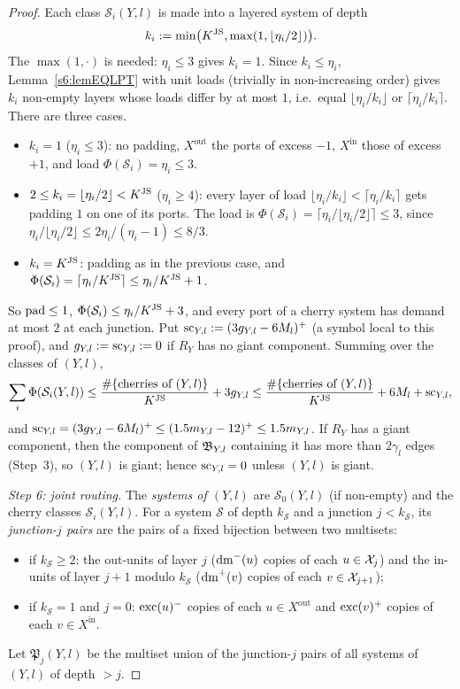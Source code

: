 \begin{proof}
Each class $\mathcal S_i(Y,l)$ is made into a layered system of depth
\[
k_i:=\min\bigl(K^{\mathrm{JS}},\max(1,\lfloor\eta_i/2\rfloor)\bigr).
\]
The $\max(1,\cdot)$ is needed: $\eta_i\le3$ gives $k_i=1$. Since $k_i\le\eta_i$, Lemma~\ref{s6:lemEQLPT} with unit loads (trivially in non-increasing order) gives $k_i$ non-empty layers whose loads differ by at most $1$, i.e.\ equal $\lfloor\eta_i/k_i\rfloor$ or $\lceil\eta_i/k_i\rceil$. There are three cases.
\begin{itemize}
\item $k_i=1$ ($\eta_i\le3$): no padding, $X^{\mathrm{out}}$ the ports of excess $-1$, $X^{\mathrm{in}}$ those of excess $+1$, and load $\Phi(\mathcal S_i)=\eta_i\le3$.
\item $2\le k_i=\lfloor\eta_i/2\rfloor<K^{\mathrm{JS}}$ ($\eta_i\ge4$): every layer of load $\lfloor\eta_i/k_i\rfloor<\lceil\eta_i/k_i\rceil$ gets padding $1$ on one of its ports. The load is $\Phi(\mathcal S_i)=\lceil\eta_i/\lfloor\eta_i/2\rfloor\rceil\le3$, since $\eta_i/\lfloor\eta_i/2\rfloor\le2\eta_i/(\eta_i-1)\le8/3$.
\item $k_i=K^{\mathrm{JS}}$: padding as in the previous case, and $\Phi(\mathcal S_i)=\lceil\eta_i/K^{\mathrm{JS}}\rceil\le\eta_i/K^{\mathrm{JS}}+1$.
\end{itemize}
So $\mathrm{pad}\le1$, $\Phi(\mathcal S_i)\le\eta_i/K^{\mathrm{JS}}+3$, and every port of a cherry system has demand at most $2$ at each junction. Put $\mathrm{sc}_{Y,l}:=(3g_{Y,l}-6M_l)^+$ (a symbol local to this proof), and $g_{Y,l}:=\mathrm{sc}_{Y,l}:=0$ if $R_Y$ has no giant component. Summing over the classes of $(Y,l)$,
\begin{equation}\label{s6:eqCherryCost}
\sum_i\Phi(\mathcal S_i(Y,l))\le\frac{\#\{\text{cherries of }(Y,l)\}}{K^{\mathrm{JS}}}+3g_{Y,l}\le\frac{\#\{\text{cherries of }(Y,l)\}}{K^{\mathrm{JS}}}+6M_l+\mathrm{sc}_{Y,l},
\end{equation}
and $\mathrm{sc}_{Y,l}=(3g_{Y,l}-6M_l)^+\le(1.5m_{Y,l}-12)^+\le1.5m_{Y,l}$. If $R_Y$ has a giant component, then the component of $\mathfrak{B}_{Y,l}$ containing it has more than $2\gamma_l$ edges (Step~3), so $(Y,l)$ is giant; hence $\mathrm{sc}_{Y,l}=0$ unless $(Y,l)$ is giant.

\emph{Step 6: joint routing.} The \emph{systems of $(Y,l)$} are $\mathcal S_0(Y,l)$ (if non-empty) and the cherry classes $\mathcal S_i(Y,l)$. For a system $\mathcal S$ of depth $k_{\mathcal S}$ and a junction $j<k_{\mathcal S}$, its \emph{junction-$j$ pairs} are the pairs of a fixed bijection between two multisets:
\begin{itemize}
\item if $k_{\mathcal S}\ge2$: the out-units of layer $j$ ($\mathrm{dm}^-(u)$ copies of each $u\in\mathcal{X}_j$) and the in-units of layer $j+1$ modulo $k_{\mathcal S}$ ($\mathrm{dm}^+(v)$ copies of each $v\in\mathcal{X}_{j+1}$);
\item if $k_{\mathcal S}=1$ and $j=0$: $\mathrm{exc}(u)^-$ copies of each $u\in X^{\mathrm{out}}$ and $\mathrm{exc}(v)^+$ copies of each $v\in X^{\mathrm{in}}$.
\end{itemize}
Let $\mathfrak P_j(Y,l)$ be the multiset union of the junction-$j$ pairs of all systems of $(Y,l)$ of depth $>j$.


\end{proof}
